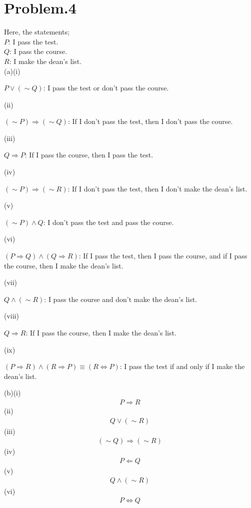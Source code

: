 \documentclass[12pt]{article}
\begin{document}
\section*{Problem.4}
Here, the statements;\\[1em]
$P$: I pass the test.\\[1em]
$Q$: I pass the course.\\[1em]
$R$: I make the dean's list.\\[1em]
(a)(i)
\begin{center}
$P \lor (\sim Q)$: I pass the test or don't pass the course.
\end{center}
(ii)
\begin{center}
$(\sim P) \Rightarrow (\sim Q)$: If I don't pass the test, then I don't pass the course.
\end{center}
(iii)
\begin{center}
$Q \Rightarrow P$: If I pass the course, then I pass the test.
\end{center}
(iv)
\begin{center}
$(\sim P) \Rightarrow (\sim R)$: If I don't pass the test, then I don't make the dean's list.
\end{center}
(v)
\begin{center}
$(\sim P) \land Q$: I don't pass the test and pass the course.
\end{center}
(vi)
\begin{center}
$(P \Rightarrow Q) \land (Q \Rightarrow R)$: If I pass the test, then I pass the course, and if I pass the course, then I make the dean's list.
\end{center}
(vii)
\begin{center}
$Q \land (\sim R)$: I pass the course and don't make the dean's list.
\end{center}
(viii)
\begin{center}
$Q \Rightarrow R$: If I pass the course, then I make the dean's list.
\end{center}
(ix)
\begin{center}
$(P \Rightarrow R) \land (R \Rightarrow P) \equiv (R \Leftrightarrow P)$: I pass the test if and only if I make the dean's list.
\end{center}
(b)(i)
\begin{gather*}
P \Rightarrow R
\end{gather*}
(ii)
\begin{gather*}
Q \lor (\sim R)
\end{gather*}
(iii)
\begin{gather*}
(\sim Q) \Rightarrow (\sim R)
\end{gather*}
(iv)
\begin{gather*}
P \Leftarrow Q
\end{gather*}
(v)
\begin{gather*}
Q \land (\sim R)
\end{gather*}
(vi)
\begin{gather*}
P \Leftrightarrow Q
\end{gather*}
\end{document}
